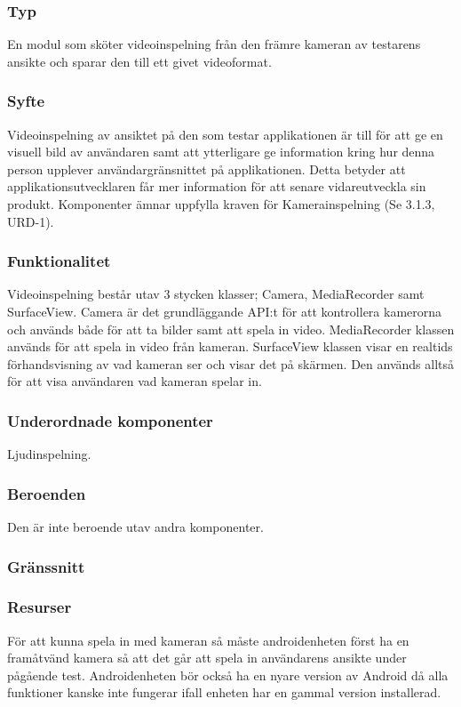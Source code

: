 \subsubsection{Typ}
En modul som sköter videoinspelning från den främre kameran av testarens ansikte och sparar den till ett givet videoformat.

\subsubsection{Syfte}
Videoinspelning av ansiktet på den som testar applikationen är till för att ge en visuell bild av användaren samt att ytterligare ge information kring hur denna person upplever användargränsnittet på applikationen. Detta betyder att applikationsutvecklaren får mer information för att senare vidareutveckla sin produkt. Komponenter ämnar uppfylla kraven för Kamerainspelning (Se 3.1.3, URD-1).

\subsubsection{Funktionalitet}
Videoinspelning består utav 3 stycken klasser; Camera, MediaRecorder samt SurfaceView. Camera är det grundläggande API:t för att kontrollera kamerorna och används både för att ta bilder samt att spela in video. MediaRecorder klassen används för att spela in video från kameran. SurfaceView klassen visar en realtids förhandsvisning av vad kameran ser och visar det på skärmen. Den används alltså för att visa användaren vad kameran spelar in.

\subsubsection{Underordnade komponenter}
Ljudinspelning.

\subsubsection{Beroenden}
Den är inte beroende utav andra komponenter.

\subsubsection{Gränssnitt}


\subsubsection{Resurser}
För att kunna spela in med kameran så måste androidenheten först ha en framåtvänd kamera så att det går att spela in användarens ansikte under pågående test. Androidenheten bör också ha en nyare version av Android då alla funktioner kanske inte fungerar ifall enheten har en gammal version installerad.

